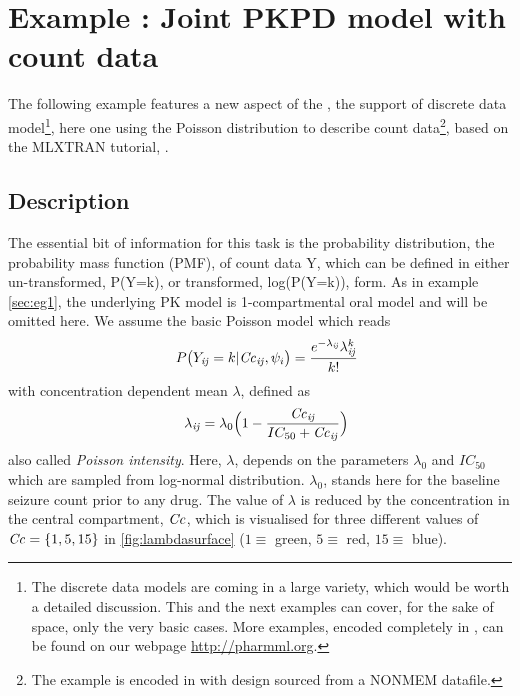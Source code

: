 
\newpage

\section{Example \theexamples: Joint PKPD model with count data}
\label{sec:eg6}
The following example features a new aspect of the \pml, the support of discrete 
data model\footnote{The discrete data models are coming in a large variety, which 
would be worth a detailed discussion. This and the next examples can cover, for 
the sake of space, only the very basic cases. More examples, encoded completely 
in \pml, can be found on our webpage \url{http://pharmml.org}.}, here one using 
the Poisson distribution to describe count data\footnote{The example is encoded 
in  with design sourced from a NONMEM datafile.}, 
based on the MLXTRAN tutorial, \cite{Monolix4.3Tutorial:2014}.
\subsection{Description}
\label{subsec:exp6_intro} 
The essential bit of information for this task is the probability distribution, the probability 
mass function (PMF), of count data Y, which can be defined in either un-transformed, 
P(Y=k), or transformed, log(P(Y=k)), form. As in example \ref{sec:eg1}, the underlying 
PK model is 1-compartmental oral model and will be omitted here. We assume the basic 
Poisson model which reads
\begin{eqnarray}
&& P\big(Y_{\mathit{ij}}=k | \mathit{Cc}_{\mathit{ij}}, \psi_i\big) =  \frac{e^{-\lambda_{\mathit{ij}}} \lambda^k_{\mathit{ij}}}{k!} \label{eq:poissonModel}
\end{eqnarray}
with concentration dependent mean $\lambda$, defined as
\begin{eqnarray}
&& \lambda_{\mathit{ij}} = \lambda_0 \Big(1 - \frac{\mathit{Cc}_{\mathit{ij}}}{IC_{50} + \mathit{Cc}_{\mathit{ij}}}\Big)  \label{eq:lambdasurface}
\end{eqnarray}
also called \emph{Poisson intensity}. Here, $\lambda$, depends on the parameters 
$\lambda_0$ and $IC_{50}$ which are sampled from log-normal distribution. 
$\lambda_0$, stands here for the baseline seizure count prior to any drug. 
The value of $\lambda$ is reduced by the concentration in the central 
compartment, $\mathit{Cc}$, which is visualised for three different values 
of $\mathit{Cc} = \{1,5,15\}$ in \ref{fig:lambdasurface} ($1\equiv$ green, $5 \equiv$ 
red, $15 \equiv$ blue).

